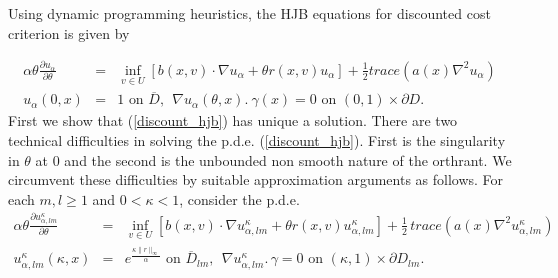 \documentclass[11pt]{amsart}
\numberwithin{equation}{section}
\begin{document}
Using dynamic programming heuristics, the HJB equations for discounted cost criterion is given by

\begin{equation}\label{discount_hjb}
\begin{array}{rcl}
\displaystyle{
 \alpha\theta\frac{\partial u_{\alpha}}{\partial \theta} } &=& \displaystyle{ \inf_{v \in U} 
\left[ b(x,v)\cdot 
\nabla u_{\alpha} + \theta r(x,v)u_{\alpha}\right] 
+ \frac{1}{2}trace (a(x)\nabla^2 u_{\alpha})  } \\
\displaystyle{ u_{\alpha}(0,x) } &=& \displaystyle{ 1 \mbox{ on } \overline {D}, \ \ \nabla u_{\alpha}(\theta,x) .\ \gamma(x)=0 \mbox{ on } (0,1) \times \partial D.}
\end{array}
\end{equation}
First we show that  (\ref{discount_hjb}) has unique a solution. 
There are two technical difficulties in solving  the p.d.e. (\ref{discount_hjb}). First is the
singularity in $\theta$ at $0$ and the second is the unbounded non smooth nature of the orthrant.
We circumvent these difficulties by suitable approximation arguments as follows.
For each $m,l \geq 1$ and $0 < \kappa < 1$, consider the p.d.e. 
\begin{equation}
\begin{array}{rcl}\label{D_m}
\displaystyle{
 \alpha\theta\frac{\partial u^{\kappa}_{\alpha,lm}}{\partial \theta} } &=& 
\displaystyle{ \inf_{v \in U} \left[ b(x,v)\cdot 
\nabla u^{\kappa}_{\alpha,lm} + \theta r(x,v)u^{\kappa}_{\alpha,lm}\right]+ \frac{1}{2} \, 
trace (a(x)\nabla^2 u^{\kappa}_{\alpha,lm}) } \\
\displaystyle{ u^{\kappa}_{\alpha,lm}(\kappa,x) } &=& \displaystyle{ e^{\frac{\kappa \|r\|_{\infty}}{\alpha}} \mbox{ on }  \overline D_{lm} , \ \ 
\nabla u^{\kappa}_{\alpha,lm}. \, \gamma=0 \mbox{ on } (\kappa,1)\times \partial D_{lm}.}
\end{array}
\end{equation}
\end{document}
